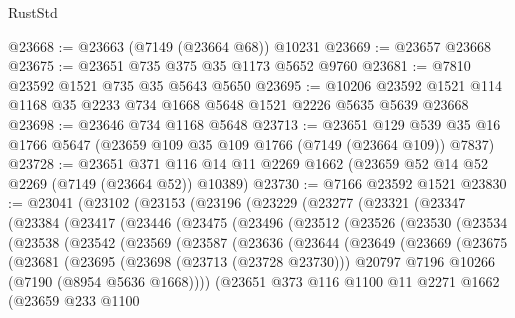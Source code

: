 \begin{lexlean}{RustStd}
\begin{coremodule}
@23668 := @23663 (@7149 (@23664 @68)) @10231
@23669 := @23657 @23668
@23675 := @23651 @735 @375 @35 @1173 @5652 @9760
@23681 := @7810 @23592 @1521 @735 @35 @5643 @5650
@23695 := @10206 @23592 @1521 @114 @1168 @35 @2233 @734 @1668 @5648 @1521 @2226 @5635 @5639 @23668
@23698 := @23646 @734 @1168 @5648
@23713 := @23651
    @129
    @539
    @35
    @16
    @1766
    @5647
    (@23659 @109 @35 @109 @1766 (@7149 (@23664 @109)) @7837)
@23728 := @23651
    @371
    @116
    @14
    @11
    @2269
    @1662
    (@23659 @52 @14 @52 @2269 (@7149 (@23664 @52)) @10389)
@23730 := @7166 @23592 @1521
@23830 := @23041
    (@23102
      (@23153
        (@23196
          (@23229
            (@23277
              (@23321
                (@23347
                  (@23384
                    (@23417
                      (@23446
                        (@23475
                          (@23496
                            (@23512
                              (@23526
                                (@23530
                                  (@23534
                                    (@23538
                                      (@23542
                                        (@23569
                                          (@23587
                                            (@23636
                                              (@23644
                                                (@23649
                                                  (@23669
                                                    (@23675
                                                      (@23681
                                                        (@23695
                                                          (@23698 (@23713 (@23728 @23730)))
                                                          @20797
                                                          @7196
                                                          @10266
                                                          (@7190 (@8954 @5636 @1668))))
                                                      (@23651
                                                        @373
                                                        @116
                                                        @1100
                                                        @11
                                                        @2271
                                                        @1662
                                                        (@23659
                                                          @233
                                                          @1100

\end{coremodule}
\end{lexlean}

